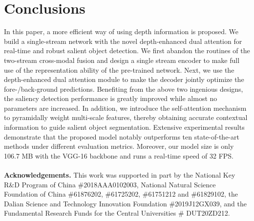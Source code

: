 \documentclass[runningheads]{llncs}
\begin{document}
\section{Conclusions}
In this paper, a more efficient way of using depth information is proposed. We build a single-stream network with the novel depth-enhanced dual attention for real-time and robust salient object detection. We first abandon the routines of the two-stream cross-modal fusion and design a single stream encoder to make full use of the representation ability of the pre-trained network. Next, we use the depth-enhanced dual attention module to make the decoder jointly optimize the fore-/back-ground predictions. Benefiting from the above two ingenious designs, the saliency detection performance is greatly improved while almost no parameters are increased. In addition, we introduce the self-attention mechanism to pyramidally weight multi-scale features, thereby obtaining accurate contextual information to guide salient object segmentation.
Extensive experimental results demonstrate that the proposed model notably outperforms ten state-of-the-art methods under different evaluation metrics. Moreover, our model size is only 106.7 MB with the VGG-16 backbone and runs a real-time speed of 32 FPS. 
\\  
\\
\textbf{Acknowledgements.}
This work was supported in part by the
National Key R\&D Program of China \#2018AAA0102003,
National Natural Science Foundation of China \#61876202, \#61725202, \#61751212 and \#61829102,
the Dalian Science and Technology Innovation Foundation \#2019J12GX039, 
and the Fundamental Research Funds for the Central Universities \# DUT20ZD212.  

\clearpage


\end{document}
